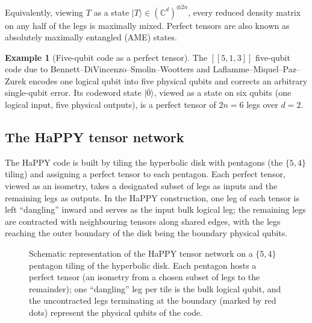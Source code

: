 \documentclass[12pt]{article}
\theoremstyle{definition}
\newtheorem{example}[theorem]{Example}
\theoremstyle{remark}
\begin{document}
Equivalently, viewing $T$ as a state $|T\rangle \in (\mathbb{C}^d)^{\otimes 2n}$, every reduced density matrix on any half of the legs is maximally mixed. Perfect tensors are also known as absolutely maximally entangled (AME) states.

\begin{example}[Five-qubit code as a perfect tensor]
\label{ex:5qubit}
The $[[5,1,3]]$ five-qubit code due to Bennett--DiVincenzo--Smolin--Wootters and Laflamme--Miquel--Paz--Zurek encodes one logical qubit into five physical qubits and corrects an arbitrary single-qubit error. Its codeword state $|\overline{0}\rangle$, viewed as a state on six qubits (one logical input, five physical outputs), is a perfect tensor of $2n=6$ legs over $d=2$.
\end{example}

\subsection{The HaPPY tensor network}

The HaPPY code \cite{pyhp2015} is built by tiling the hyperbolic disk with pentagons (the $\{5,4\}$ tiling) and assigning a perfect tensor to each pentagon. Each perfect tensor, viewed as an isometry, takes a designated subset of legs as inputs and the remaining legs as outputs. In the HaPPY construction, one leg of each tensor is left ``dangling'' inward and serves as the input bulk logical leg; the remaining legs are contracted with neighbouring tensors along shared edges, with the legs reaching the outer boundary of the disk being the boundary physical qubits.

\begin{figure}[htbp]
\centering
{}
\caption{Schematic representation of the HaPPY tensor network on a $\{5,4\}$ pentagon tiling of the hyperbolic disk. Each pentagon hosts a perfect tensor (an isometry from a chosen subset of legs to the remainder); one ``dangling'' leg per tile is the bulk logical qubit, and the uncontracted legs terminating at the boundary (marked by red dots) represent the physical qubits of the code.}
\label{fig:happy}
\end{figure}
\end{document}
